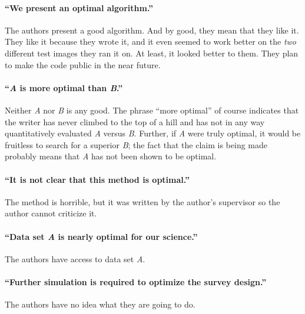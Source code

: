 \documentclass[12pt, preprint]{aastex}
\begin{document}
\paragraph{``We present an optimal algorithm.''}
The authors present a good algorithm.  And by good, they
mean that they like it.  They like it because they wrote it, and it
even seemed to work better on the \emph{two} different test images
they ran it on.  At least, it looked better to them.  They plan
to make the code public in the near future.



\paragraph{``\emph{A} is more optimal than \emph{B}.''}
Neither \emph{A} nor \emph{B} is any good.  The phrase
``more optimal'' of course indicates that the writer has never climbed
to the top of a hill and has not in any way quantitatively evaluated
\emph{A} versus \emph{B}.  Further, if \emph{A} were truly optimal, it
would be fruitless to search for a superior \emph{B}; the fact that
the claim is being made probably means that \emph{A} has not been
shown to be optimal.

\paragraph{``It is not clear that this method is optimal.''}
The method is horrible, but it was written by the author's supervisor
so the author cannot criticize it.


\paragraph{``Data set \emph{A} is nearly optimal for our science.''}
The authors have access to data set \emph{A}.


\paragraph{``Further simulation is required to optimize the survey design.''}
%
%
The authors have no idea what they are going to do.
\end{document}
